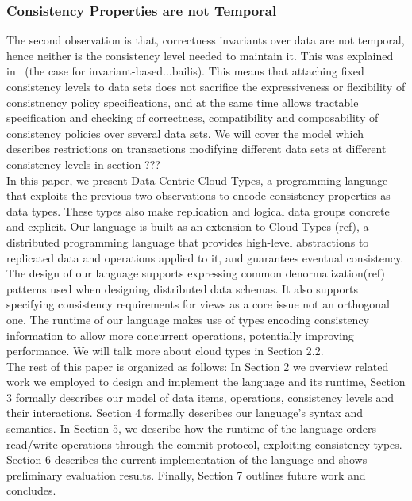 \subsubsection{Consistency Properties are not Temporal}
The second observation is that, correctness invariants over data are not temporal, hence
neither is the consistency level needed to maintain it. This was explained
in~\cite{bailis2014coordination} (the case for
invariant-based...bailis). This means that attaching fixed consistency levels to
data sets does not sacrifice the expressiveness or flexibility of consistnency
policy specifications, and at the same time allows tractable specification and checking of
correctness, compatibility and composability of consistency policies over
several data sets. We will cover the model which describes restrictions on
transactions modifying different data sets at different consistency levels in
section ??? \\

In this paper, we present Data Centric Cloud Types, a programming language that
exploits the previous two observations to encode consistency properties as data
types. These types also make replication and logical data groups concrete and
explicit. Our language is built as an extension to Cloud Types (ref), 
a distributed programming language that provides high-level abstractions to replicated
data and operations applied to it, and guarantees eventual consistency. 
The design of our language supports expressing common denormalization(ref) patterns used when designing distributed
data schemas. It also supports specifying consistency requirements for views as
a core issue not an orthogonal one. The runtime of our language makes use of
types encoding 
consistency information to allow more concurrent operations, potentially
improving performance. We will talk more about cloud types in Section 2.2. \\

The rest of this paper is organized as follows: In Section 2 we overview related
work we employed to design and implement the language and its runtime,
Section 3 formally describes our model of data items, operations, consistency
levels and their interactions. Section 4 formally describes our language's syntax and
semantics. In Section 5, we describe how the runtime of the language orders
read/write operations through the commit protocol, exploiting consistency types. 
Section 6 describes the current implementation of the language and shows preliminary evaluation
results. Finally, Section 7 outlines future work and concludes. 

